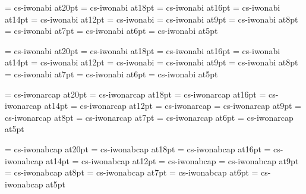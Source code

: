 \font\twentyitbf=      cs-iwonabi at20pt
\font\eighteenitbf=    cs-iwonabi at18pt
\font\sixteenitbf=     cs-iwonabi at16pt
\font\fourteenitbf=    cs-iwonabi at14pt
\font\twelveitbf=      cs-iwonabi at12pt
\font\itbf=            cs-iwonabi
\font\nineitbf=        cs-iwonabi at9pt
\font\eightitbf=       cs-iwonabi at8pt
\font\sevenitbf=       cs-iwonabi at7pt
\font\sixitbf=         cs-iwonabi at6pt
\font\fiveitbf=        cs-iwonabi at5pt

\font\twentyslbf=      cs-iwonabi at20pt
\font\eighteenslbf=    cs-iwonabi at18pt
\font\sixteenslbf=     cs-iwonabi at16pt
\font\fourteenslbf=    cs-iwonabi at14pt
\font\twelveslbf=      cs-iwonabi at12pt
\font\slbf=            cs-iwonabi
\font\nineslbf=        cs-iwonabi at9pt
\font\eightslbf=       cs-iwonabi at8pt
\font\sevenslbf=       cs-iwonabi at7pt
\font\sixslbf=         cs-iwonabi at6pt
\font\fiveslbf=        cs-iwonabi at5pt

\font\twentycaps=      cs-iwonarcap at20pt
\font\eighteencaps=    cs-iwonarcap at18pt
\font\sixteencaps=     cs-iwonarcap at16pt
\font\fourteencaps=    cs-iwonarcap at14pt
\font\twelvecaps=      cs-iwonarcap at12pt
\font\caps=            cs-iwonarcap
\font\ninecaps=        cs-iwonarcap at9pt
\font\eightcaps=       cs-iwonarcap at8pt
\font\sevencaps=       cs-iwonarcap at7pt
\font\sixcaps=         cs-iwonarcap at6pt
\font\fivecaps=        cs-iwonarcap at5pt

\font\twentycapsbf=      cs-iwonabcap at20pt
\font\eighteencapsbf=    cs-iwonabcap at18pt
\font\sixteencapsbf=     cs-iwonabcap at16pt
\font\fourteencapsbf=    cs-iwonabcap at14pt
\font\twelvcsapsbf=      cs-iwonabcap at12pt
\font\capsbf=            cs-iwonabcap
\font\nincsapsbf=        cs-iwonabcap at9pt
\font\eightcapsbf=       cs-iwonabcap at8pt
\font\sevencapsbf=       cs-iwonabcap at7pt
\font\sixcapsbf=         cs-iwonabcap at6pt
\font\fivcsapsbf=        cs-iwonabcap at5pt

\rm 